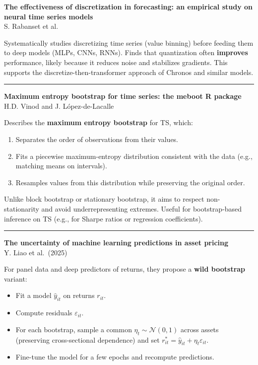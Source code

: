 \documentclass[a5paper]{article}
\providecommand{\tightlist}{%
  \setlength{\itemsep}{0pt}\setlength{\parskip}{0pt}}
\begin{document}
\textbf{The effectiveness of discretization in forecasting: an empirical
study on neural time series models}\\
S. Rabanset et al.

Systematically studies discretizing time series (value binning) before
feeding them to deep models (MLPs, CNNs, RNNs). Finds that quantization
often \textbf{improves} performance, likely because it reduces noise and
stabilizes gradients. This supports the discretize-then-transformer
approach of Chronos and similar models.

\begin{center}\rule{0.5\linewidth}{0.5pt}\end{center}

\textbf{Maximum entropy bootstrap for time series: the meboot R
package}\\
H.D. Vinod and J. López-de-Lacalle

Describes the \textbf{maximum entropy bootstrap} for TS, which:

\begin{enumerate}
\def\labelenumi{\arabic{enumi}.}
\tightlist
\item
  Separates the order of observations from their values.
\item
  Fits a piecewise maximum-entropy distribution consistent with the data
  (e.g., matching means on intervals).
\item
  Resamples values from this distribution while preserving the original
  order.
\end{enumerate}

Unlike block bootstrap or stationary bootstrap, it aims to respect
non-stationarity and avoid underrepresenting extremes. Useful for
bootstrap-based inference on TS (e.g., for Sharpe ratios or regression
coefficients).

\begin{center}\rule{0.5\linewidth}{0.5pt}\end{center}

\textbf{The uncertainty of machine learning predictions in asset
pricing}\\
Y. Liao et al.~(2025)

For panel data and deep predictors of returns, they propose a
\textbf{wild bootstrap} variant:

\begin{itemize}
\tightlist
\item
  Fit a model $\hat y_{it}$ on returns $r_{it}$.
\item
  Compute residuals $\varepsilon_{it}$.
\item
  For each bootstrap, sample a common $\eta_t\sim \mathcal{N}(0,1)$ across assets
  (preserving cross-sectional dependence) and set $r^*_{it} =
  \hat y_{it} + \eta_t \varepsilon_{it}$.
\item
  Fine-tune the model for a few epochs and recompute predictions.
\end{itemize}
\end{document}
